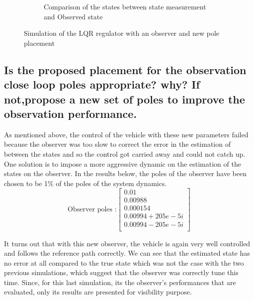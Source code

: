 \begin{figure}[H]
\begin{subfigure}[b]{0.95\textwidth}
         \caption{Comparison of the states between state measurement and Observed state}
         \label{fig:Obs2}
     \end{subfigure}
    \caption{Simulation of the LQR regulator with an observer and new pole placement}
    \label{fig:sim2}
\end{figure}


\subsection{Is the proposed placement for the observation close loop poles appropriate? why? If not,propose a new set of poles to improve the observation performance.}

As mentioned above, the control of the vehicle with these new parameters failed because the observer was too slow to correct the error in the estimation of between the states and so the control got carried away and could not catch up. One solution is to impose a more aggressive dynamic on the estimation of the states on the observer. In the results below, the poles of the observer have been chosen to be 1\% of the poles of the system dynamics.
\begin{equation}
    \text{Observer poles :}
    \left[\begin{array}{c}
         0.01\\
         0.00988\\
         0.000154\\
         0.00994 + 205e-5i\\
         0.00994 - 205e-5i\\
    \end{array}\right]
\end{equation}

It turns out that with this new observer, the vehicle is again very well controlled and follows the reference path correctly. We can see that the estimated state has no error at all compared to the true state which was not the case with the two previous simulations, which suggest that the observer was correctly tune this time. Since, for this last simulation, its the observer's performances that are evaluated, only its results are presented for visibility purpose.

